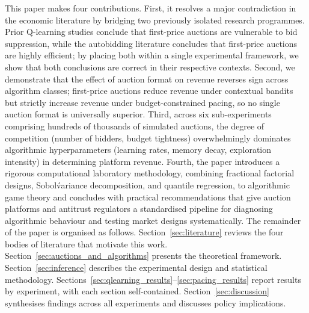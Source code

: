 This paper makes four contributions. First, it resolves a major contradiction in the economic literature by bridging two previously isolated research programmes. Prior Q-learning studies conclude that first-price auctions are vulnerable to bid suppression, while the autobidding literature concludes that first-price auctions are highly efficient; by placing both within a single experimental framework, we show that both conclusions are correct in their respective contexts. Second, we demonstrate that the effect of auction format on revenue reverses sign across algorithm classes; first-price auctions reduce revenue under contextual bandits but strictly increase revenue under budget-constrained pacing, so no single auction format is universally superior. Third, across six sub-experiments comprising hundreds of thousands of simulated auctions, the degree of competition (number of bidders, budget tightness) overwhelmingly dominates algorithmic hyperparameters (learning rates, memory decay, exploration intensity) in determining platform revenue. Fourth, the paper introduces a rigorous computational laboratory methodology, combining fractional factorial designs, Sobol\' variance decomposition, and quantile regression, to algorithmic game theory and concludes with practical recommendations that give auction platforms and antitrust regulators a standardised pipeline for diagnosing algorithmic behaviour and testing market designs systematically. The remainder of the paper is organised as follows. Section~\ref{sec:literature} reviews the four bodies of literature that motivate this work. Section~\ref{sec:auctions_and_algorithms} presents the theoretical framework. Section~\ref{sec:inference} describes the experimental design and statistical methodology. Sections~\ref{sec:qlearning_results}--\ref{sec:pacing_results} report results by experiment, with each section self-contained. Section~\ref{sec:discussion} synthesises findings across all experiments and discusses policy implications.

